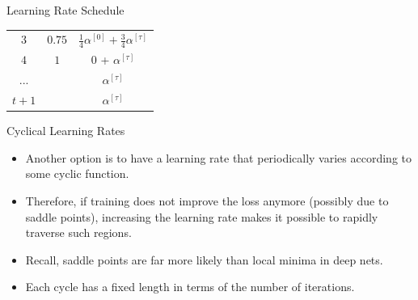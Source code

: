 \begin{vbframe}{Learning Rate Schedule}
\begin{minipage}{\linewidth}
\begin{center}
{\begin{tabular}{l | c | c}
        \multicolumn{1}{c|}{$3$}       
        & $0.75$  
        & $\frac{1}{4}\alpha^{[0]} + \frac{3}{4}\alpha^{[\tau]}$ \\
        
        \multicolumn{1}{c|}{$4$}       
        & $1$     
        & 0 + $\alpha^{[\tau]}$ \\
        
        \multicolumn{1}{c|}{$...$}       
        &      
        & $\alpha^{[\tau]}$ \\
        
        \multicolumn{1}{c|}{$t+1$}     
        & 
        & $\alpha^{[\tau]} $
        \end{tabular}
        }
  \end{center}
\end{minipage}
  \begin{figure}
  \centering
  \end{figure}
\end{vbframe}


\begin{frame} {Cyclical Learning Rates}
  \begin{itemize}
    \item Another option is to have a learning rate that periodically varies according to some cyclic function.
    \item Therefore, if training does not improve the loss anymore (possibly due to saddle points), increasing the learning rate makes it possible to rapidly traverse such regions.
    \item Recall, saddle points are far more likely than local minima in deep nets.
    \item Each cycle has a fixed length in terms of the number of iterations. 
  \end{itemize}
\end{frame}


